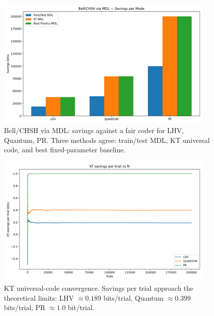 \documentclass[aps,preprint,onecolumn,longbibliography,nofootinbib]{revtex4-2}
\numberwithin{equation}{section}        %
\begin{document}
\begin{figure}[H]
\centering
\includegraphics[width=0.95\textwidth]{Bell_CHSH_via_MDL_Savings_per_Mode.png}
\caption{Bell/CHSH via MDL: savings against a fair coder for LHV, Quantum, PR. Three methods agree: train/test MDL, KT universal code, and best fixed-parameter baseline.}
\label{fig:bell_savings_bar}
\end{figure}

\begin{figure}[H]
\centering
\includegraphics[width=0.95\textwidth]{KT_savings_per_trial_vs_N.png}
\caption{KT universal-code convergence. Savings per trial approach the theoretical limits: LHV $\approx 0.189$ bits/trial, Quantum $\approx 0.399$ bits/trial, PR $\approx 1.0$ bit/trial.}
\label{fig:kt_convergence}
\end{figure}
\end{document}
